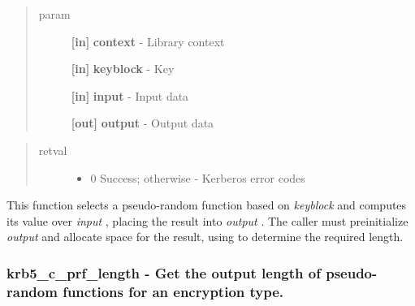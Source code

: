 \documentclass[letterpaper,10pt,english]{sphinxmanual}
\begin{document}
\begin{quote}\begin{description}
\item[{param}] \leavevmode
\textbf{{[}in{]}} \textbf{context} - Library context

\textbf{{[}in{]}} \textbf{keyblock} - Key

\textbf{{[}in{]}} \textbf{input} - Input data

\textbf{{[}out{]}} \textbf{output} - Output data

\end{description}\end{quote}
\begin{quote}\begin{description}
\item[{retval}] \leavevmode\begin{itemize}
\item {} 
0   Success; otherwise - Kerberos error codes

\end{itemize}

\end{description}\end{quote}

This function selects a pseudo-random function based on \emph{keyblock} and computes its value over \emph{input} , placing the result into \emph{output} . The caller must preinitialize \emph{output} and allocate space for the result, using {\hyperref[appdev/refs/api/krb5_c_prf_length:krb5_c_prf_length]{}} to determine the required length.


\subsubsection{krb5\_c\_prf\_length -  Get the output length of pseudo-random functions for an encryption type.}
\label{appdev/refs/api/krb5_c_prf_length::doc}\label{appdev/refs/api/krb5_c_prf_length:krb5-c-prf-length-get-the-output-length-of-pseudo-random-functions-for-an-encryption-type}

\begin{fulllineitems}
\label{appdev/refs/api/krb5_c_prf_length:krb5_c_prf_length}
\end{fulllineitems}
\end{document}
